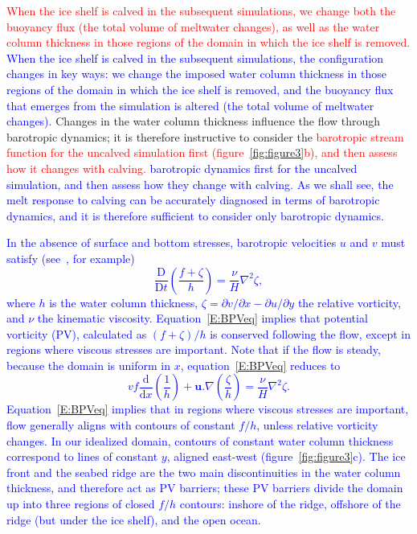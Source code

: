 \documentclass[draft]{agujournal2019}
\newcommand{\red}[1]{\textcolor{red}{#1}}
\newcommand{\blue}[1]{\textcolor{blue}{#1}}
\begin{document}
\red{When the ice shelf is calved in the subsequent simulations, we change both the buoyancy flux (the total volume of meltwater changes), as well as the water column thickness in those regions of the domain in which the ice shelf is removed.}
\blue{When the ice shelf is calved in the subsequent simulations, the configuration changes in key ways: we change the imposed water column thickness in those regions of the domain in which the ice shelf is removed, and the buoyancy flux that emerges from the simulation is altered (the total volume of meltwater changes).}
 Changes in the water column thickness influence the flow through barotropic dynamics; it is therefore instructive to consider the \red{barotropic stream function for the uncalved simulation first (figure~\ref{fig:figure3}b), and then assess how it changes with calving.}  \blue{barotropic dynamics first for the uncalved simulation, and then assess how they change with calving. As we shall see, the melt response to calving can be accurately diagnosed in terms of barotropic dynamics, and it is therefore sufficient to consider only barotropic dynamics.}
 
\blue{ In the absence of surface and bottom stresses, barotropic velocities $u$ and $v$ must satisfy (see~\cite{Patmore2019JPO}, for example)
 \begin{equation}\label{E:BPVeq}
\frac{\mathrm{D}}{\mathrm{D}t}\left( \frac{f + \zeta}{h}\right) = \frac{\nu}{H}\nabla^2 \zeta,
 \end{equation}
where $h$ is the water column thickness, $\zeta = \partial v / \partial x - \partial u / \partial y$ the relative vorticity,  and $\nu$ the kinematic viscosity. Equation~\eqref{E:BPVeq} implies that potential vorticity (PV),  calculated as $(f + \zeta)/h$ is conserved following the flow, except in regions where viscous stresses are important. Note that if the flow is steady, because the domain is uniform in $x$, equation~\eqref{E:BPVeq} reduces to
\begin{equation}
    v f  \frac{\mathrm{d}}{\mathrm{d}x} \left(\frac{1}{h}\right) + \mathbf{u}.\nabla \left(\frac{\zeta}{h}\right) = \frac{\nu}{H}\nabla^2 \zeta.
\end{equation}
Equation~\eqref{E:BPVeq} implies that in regions where viscous stresses are important, flow generally aligns with contours of constant $f/h$, unless relative vorticity changes. In our idealized domain, contours of constant water column thickness correspond to lines of constant $y$, aligned east-west (figure~\ref{fig:figure3}c). The ice front and the seabed ridge are the two main discontinuities in the water column thickness, and therefore act as PV barriers; these PV barriers divide the domain up into three regions of closed $f/h$ contours: inshore of the ridge, offshore of the ridge (but under the ice shelf), and the open ocean.}
\end{document}
